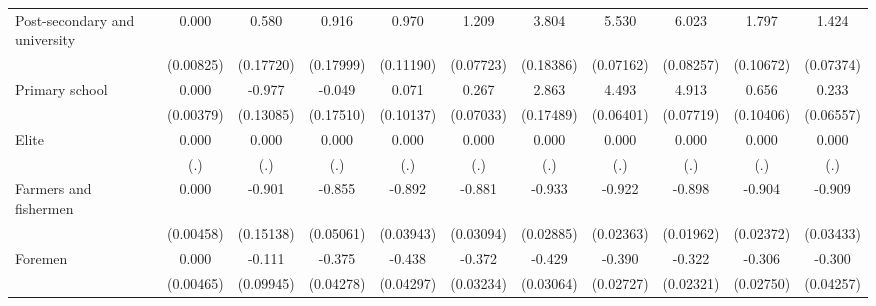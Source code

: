 {\begin{tabular}{l*{10}{c}}
Post-secondary and university&       0.000         &       0.580\sym{**} &       0.916\sym{***}&       0.970\sym{***}&       1.209\sym{***}&       3.804\sym{***}&       5.530\sym{***}&       6.023\sym{***}&       1.797\sym{***}&       1.424\sym{***}\\
                    &   (0.00825)         &   (0.17720)         &   (0.17999)         &   (0.11190)         &   (0.07723)         &   (0.18386)         &   (0.07162)         &   (0.08257)         &   (0.10672)         &   (0.07374)         \\
Primary school      &       0.000         &      -0.977\sym{***}&      -0.049         &       0.071         &       0.267\sym{***}&       2.863\sym{***}&       4.493\sym{***}&       4.913\sym{***}&       0.656\sym{***}&       0.233\sym{***}\\
                    &   (0.00379)         &   (0.13085)         &   (0.17510)         &   (0.10137)         &   (0.07033)         &   (0.17489)         &   (0.06401)         &   (0.07719)         &   (0.10406)         &   (0.06557)         \\
Elite               &       0.000         &       0.000         &       0.000         &       0.000         &       0.000         &       0.000         &       0.000         &       0.000         &       0.000         &       0.000         \\
                    &         (.)         &         (.)         &         (.)         &         (.)         &         (.)         &         (.)         &         (.)         &         (.)         &         (.)         &         (.)         \\
Farmers and fishermen&       0.000         &      -0.901\sym{***}&      -0.855\sym{***}&      -0.892\sym{***}&      -0.881\sym{***}&      -0.933\sym{***}&      -0.922\sym{***}&      -0.898\sym{***}&      -0.904\sym{***}&      -0.909\sym{***}\\
                    &   (0.00458)         &   (0.15138)         &   (0.05061)         &   (0.03943)         &   (0.03094)         &   (0.02885)         &   (0.02363)         &   (0.01962)         &   (0.02372)         &   (0.03433)         \\
Foremen             &       0.000         &      -0.111         &      -0.375\sym{***}&      -0.438\sym{***}&      -0.372\sym{***}&      -0.429\sym{***}&      -0.390\sym{***}&      -0.322\sym{***}&      -0.306\sym{***}&      -0.300\sym{***}\\
                    &   (0.00465)         &   (0.09945)         &   (0.04278)         &   (0.04297)         &   (0.03234)         &   (0.03064)         &   (0.02727)         &   (0.02321)         &   (0.02750)         &   (0.04257)         \\

\end{tabular}}
